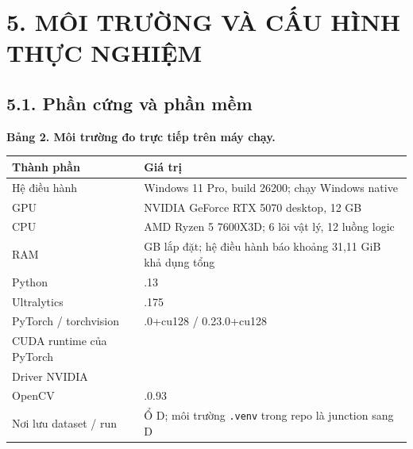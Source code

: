 \documentclass[
  vietnamese,
  12pt,
  a4paper,
]{article}
\newcounter{none} %
\begin{document}
\endgroup

\section{5. MÔI TRƯỜNG VÀ CẤU HÌNH THỰC
NGHIỆM}\label{muxf4i-trux1b0ux1eddng-vuxe0-cux1ea5u-huxecnh-thux1ef1c-nghiux1ec7m}

\subsection{5.1. Phần cứng và phần
mềm}\label{phux1ea7n-cux1ee9ng-vuxe0-phux1ea7n-mux1ec1m}

\textbf{Bảng 2. Môi trường đo trực tiếp trên máy chạy.}

\begingroup\small\setlength{\tabcolsep}{4pt}\renewcommand{\arraystretch}{1.12}

{\def\LTcaptype{none} %
\begin{longtable}[]{@{}
  >{\raggedright\arraybackslash}p{}
  >{\raggedright\arraybackslash}p{}@{}}
\toprule\noalign{}
\begin{minipage}[b]{\linewidth}\raggedright
Thành phần
\end{minipage} & \begin{minipage}[b]{\linewidth}\raggedright
Giá trị
\end{minipage} \\
\midrule\noalign{}
\endhead
\bottomrule\noalign{}
\endlastfoot
Hệ điều hành & Windows 11 Pro, build 26200; chạy Windows native \\
GPU & NVIDIA GeForce RTX 5070 desktop, 12 GB \\
CPU & AMD Ryzen 5 7600X3D; 6 lõi vật lý, 12 luồng logic \\
RAM & 32 GB lắp đặt; hệ điều hành báo khoảng 31,11 GiB khả dụng tổng \\
Python & 3.12.13 \\
Ultralytics & 8.4.175 \\
PyTorch / torchvision & 2.8.0+cu128 / 0.23.0+cu128 \\
CUDA runtime của PyTorch & 12.8 \\
Driver NVIDIA & 617.14 \\
OpenCV & 5.0.0.93 \\
Nơi lưu dataset / run & Ổ D; môi trường
\texttt{.\allowbreak{}v\allowbreak{}e\allowbreak{}n\allowbreak{}v\allowbreak{}}
trong repo là junction sang D \\
\end{longtable}
}
\end{document}
